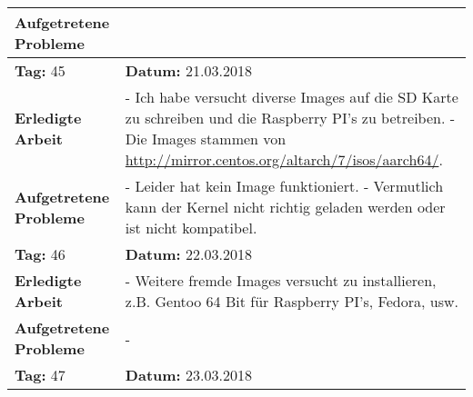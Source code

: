 \begin{longtable}{|p{5cm}|p{5cm}p{6cm}|}
\textbf{Aufgetretene Probleme} & \multicolumn{2}{p{11cm}|}{} \\ \hline
\rowcolor{heading}\textbf{Tag:} 45 & \textbf{Datum:} 21.03.2018 & \\ \hline
\textbf{Erledigte Arbeit} & \multicolumn{2}{p{11cm}|}{- Ich habe versucht diverse Images auf die SD Karte zu schreiben und die Raspberry PI's zu betreiben. \newline
- Die Images stammen von \url{http://mirror.centos.org/altarch/7/isos/aarch64/}.} \\ \hline
\textbf{Aufgetretene Probleme} & \multicolumn{2}{p{11cm}|}{- Leider hat kein Image funktioniert. \newline
- Vermutlich kann der Kernel nicht richtig geladen werden oder ist nicht kompatibel.} \\ \hline
\rowcolor{heading}\textbf{Tag:} 46 & \textbf{Datum:} 22.03.2018 & \\ \hline
\textbf{Erledigte Arbeit} & \multicolumn{2}{p{11cm}|}{- Weitere fremde Images versucht zu installieren, z.B. Gentoo 64 Bit für Raspberry PI's, Fedora, usw.} \\ \hline
\textbf{Aufgetretene Probleme \newline \newline \newline \newline \newline \newline \newline \newline \newline \newline \newline \newline \newline \newline \newline \newline \newline \newline } & \multicolumn{2}{p{11cm}|}{-} \\ \hline
\rowcolor{heading}\textbf{Tag:} 47 & \textbf{Datum:} 23.03.2018 & \\ \hline

\end{longtable}

